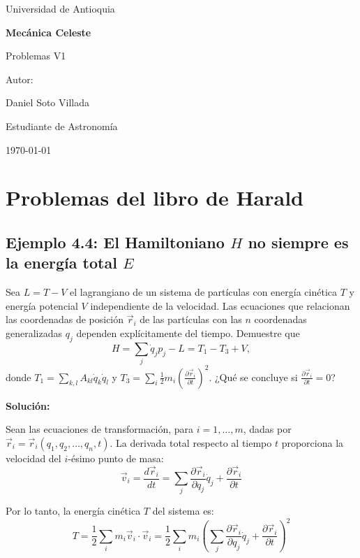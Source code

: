 \documentclass[a4paper]{article}
\begin{document}
\begin{titlepage}
  \centering
  {\Large Universidad de Antioquia\par}
  \vspace{2cm}
  {\huge\bfseries Mecánica Celeste\par}
  \vspace{0.4cm}
  {\Large Problemas V1 \par}
  \vspace{2.5cm}
  {\large Autor:\par}
  \vspace{0.2cm}
  {\large Daniel Soto Villada\par}
  {\large Estudiante de Astronomía\par}
  \vfill
  {\large \today\par}
\end{titlepage}

\newpage
\tableofcontents
\newpage

\section{Problemas del libro de Harald}
\subsection{Ejemplo 4.4: El Hamiltoniano $H$ no siempre es la energía total $E$}

Sea $L = T - V$ el lagrangiano de un sistema de partículas con energía cinética $T$ y energía potencial $V$ independiente de la velocidad. Las ecuaciones que relacionan las coordenadas de posición $\vec{r}_i$ de las partículas con las $n$ coordenadas generalizadas $q_j$ dependen explícitamente del tiempo. Demuestre que
$$H = \sum_j \dot{q}_j p_j - L = T_1 - T_3 + V,$$
donde $T_1 = \sum_{k,l} A_{kl} \dot{q}_k \dot{q}_l$ y $T_3 = \sum_i \frac{1}{2} m_i \left(\frac{\partial \vec{r}_i}{\partial t}\right)^2$. ¿Qué se concluye si $\frac{\partial \vec{r}_i}{\partial t} = 0$?

\vspace{0.5cm}
\textbf{Solución:}

Sean las ecuaciones de transformación, para $i = 1, \dots, m$, dadas por $\vec{r}_i = \vec{r}_i(q_1, q_2, \dots, q_n, t)$. La derivada total respecto al tiempo $t$ proporciona la velocidad del $i$-ésimo punto de masa:
$$\vec{v}_i = \frac{d\vec{r}_i}{dt} = \sum_j \frac{\partial \vec{r}_i}{\partial q_j} \dot{q}_j + \frac{\partial \vec{r}_i}{\partial t}$$

Por lo tanto, la energía cinética $T$ del sistema es:
$$T = \frac{1}{2} \sum_i m_i \vec{v}_i \cdot \vec{v}_i = \frac{1}{2} \sum_i m_i \left( \sum_j \frac{\partial \vec{r}_i}{\partial q_j} \dot{q}_j + \frac{\partial \vec{r}_i}{\partial t} \right)^2$$
\end{document}
